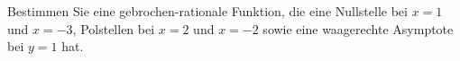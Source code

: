 \begin{ExerciseBlock}
Bestimmen Sie eine gebrochen-rationale Funktion, die eine Nullstelle bei $x=1$ und $x=-3$, Polstellen bei $x=2$ und $x=-2$ sowie eine waagerechte Asymptote bei $y=1$ hat.

\end{ExerciseBlock}
